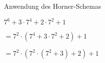 \item Anwendung des Horner-Schemas

$7^6 + 3 \cdot 7^4 + 2 \cdot 7^2 + 1$

$ = 7^2 \cdot (7^4 + 3 \cdot 7^2 + 2) + 1$

$ = 7^2 \cdot (7^2 \cdot (7^2 + 3) + 2) + 1$

